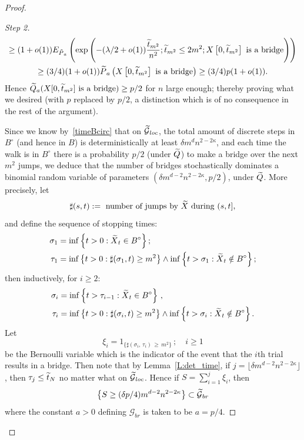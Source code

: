 \documentclass[AHL, Unicode, longabstracts, published]{cedram}
\newenvironment{step}[1]{\begin{proof}[#1]}{\let\qed\relax\end{proof}}
\newcommand{\Pmh}{P}
\newcommand*\E {{E}}
\newcommand{\cG}{\mathcal{G}}
\newcommand*\Q{{Q}}
\let\oldtilde\tilde
\renewcommand*{\tilde}[1]{\mathchoice{\widetilde{#1}}{\widetilde{#1}}{\oldtilde{#1}}{\oldtilde{#1}}}\let\oldhat\hat
\renewcommand*{\hat}[1]{\mathchoice{\widehat{#1}}{\widehat{#1}}{\oldhat{#1}}{\oldhat{#1}}}\let\oldexists\exists
\renewcommand*{\exists}{\mathrel{\oldexists}}
\begin{document}
\begin{proof}
\begin{step}{Step 2}
\begin{multline*}
\ge (1+ o(1))\E_{\tilde \Pmh_a} \left(\exp\left(- (\lambda/2 + o(1)) \frac{\tilde t_{m^2}}{n^2}; \tilde t_{m^2} \le 2m^2 ; X\left[0, \tilde t_{m^2}\right] \text{ is a bridge}\right)\right)\\
\ge (3/4) (1+ o(1)) \tilde \Pmh_a\left(X\left[0, \tilde t_{m^2}\right] \text{ is a bridge}\right) \ge (3/4) p (1+ o(1)).
\end{multline*}
Hence $\tilde \Q_a(X[0, \tilde t_{m^2}]\text{ is a bridge}) \ge p/2$ for $n$ large enough; thereby proving what we desired (with $p$ replaced by $p/2$, a distinction which is of no consequence in the rest of the argument).



Since we know by~\eqref{timeBcirc} that on $ \tilde \cG_{loc}$, the total amount of discrete steps in $B^\circ$ (and hence in $B$) is deterministically at least $\delta m^d n^{2- 2\kappa}$, and each time the walk is in $B^\circ$ there is a probability $p/2$ (under $\tilde \Q$) to make a bridge over the next $m^2$ jumps, we deduce that the number of bridges stochastically dominates a binomial random variable of parameters $(\delta m^{d-2} n^{2-2\kappa}, p/2)$, under $\tilde \Q$. More precisely, let
\[
\sharp (s,t): = \text{ number of jumps by $\tilde X $ during } (s, t],
\]
and define the sequence of stopping times:
\begin{align*}
\sigma_1 &= \inf \left\{ t>0 : \tilde X_t \in B^\circ\right\}; \\
\tau_1 &= \inf \left\{t>0: \sharp (\sigma_1, t) \ge m^2\right\} \wedge \inf \left\{ t > \sigma_1: \tilde X_t \notin B^\circ\right\};
\end{align*}
then inductively, for $i \ge 2$:
\begin{align*}
\sigma_i &= \inf \left\{ t > \tau_{i-1} : \tilde X_t \in B^\circ\right\}\,,\\
\tau_i &= \inf \left\{ t>0 : \sharp (\sigma_i, t) \ge m^2\right\} \wedge \inf \left\{ t> \sigma_i: \tilde X_t \notin B^\circ\right\}.
\end{align*}
Let
\[
\xi_i = 1_{\{\sharp(\sigma_i,\,\tau_i)\,\ge\, m^2\}}\,; \quad i \ge 1
\]
be the Bernoulli variable which is the indicator of the event that the $i$th trial results in a bridge. Then note that by Lemma~\ref{L:det_time}, if $j = \lfloor \delta m^{d-2} n^{2- 2\kappa}\rfloor $, then $\tau_j \le \tilde t_N$ no matter what on $\tilde \cG_{loc}$. Hence if $S = \sum_{i=1}^j \xi_i$, then
\[
\left\{S \ge (\delta p /4) m^{d-2} n^{2- 2\kappa}\right\} \subset \tilde \cG_{br}
\]
where the constant $a>0$ defining $\cG_{br}$ is taken to be $a = p /4$.


\end{step}
\end{proof}
\end{document}
